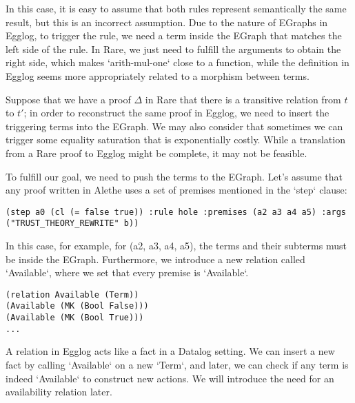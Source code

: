 \documentclass{article}
\begin{document}
In this case, it is easy to assume that both rules represent semantically the same result, but this is an incorrect assumption. Due to the nature of EGraphs in Egglog, to trigger the rule, we need a term inside the EGraph that matches the left side of the rule. In Rare, we just need to fulfill the arguments to obtain the right side, which makes `arith-mul-one` close to a function, while the definition in Egglog seems more appropriately related to a morphism between terms. 

Suppose that we have a proof $\Delta$ in Rare that there is a transitive relation from $t$ to $t'$; in order to reconstruct the same proof in Egglog, we need to insert the triggering terms into the EGraph. We may also consider that sometimes we can trigger some equality saturation that is exponentially costly. While a translation from a Rare proof to Egglog might be complete, it may not be feasible.

To fulfill our goal, we need to push the terms to the EGraph. Let's assume that any proof written in Alethe uses a set of premises mentioned in the `step` clause:

\begin{lstlisting}
(step a0 (cl (= false true)) :rule hole :premises (a2 a3 a4 a5) :args ("TRUST_THEORY_REWRITE" b))
\end{lstlisting}

In this case, for example, for (a2, a3, a4, a5), the terms and their subterms must be inside the EGraph. Furthermore, we introduce a new relation called `Available`, where we set that every premise is `Available`.

\begin{lstlisting}
(relation Available (Term))
(Available (MK (Bool False)))
(Available (MK (Bool True)))
...
\end{lstlisting}

A relation in Egglog acts like a fact in a Datalog setting. We can insert a new fact by calling `Available` on a new `Term`, and later, we can check if any term is indeed `Available` to construct new actions. We will introduce the need for an availability relation later. 
\end{document}
